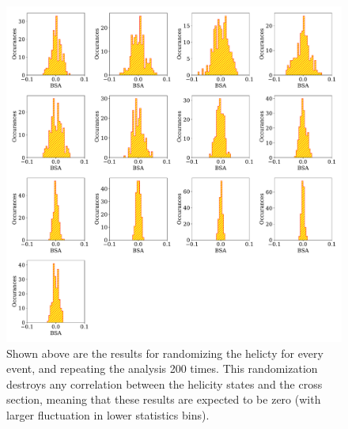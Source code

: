 \begin{figure}
  \begin{center}
    \includegraphics[width=\columnwidth]{image/helicity.pdf}
    \caption{Shown above are the results for randomizing the helicty for every event, and repeating the analysis 200 times.  This randomization destroys any correlation between the helicity states and the cross section, meaning that these results are expected to be zero (with larger fluctuation in lower statistics bins).}
  \end{center}
\end{figure}

